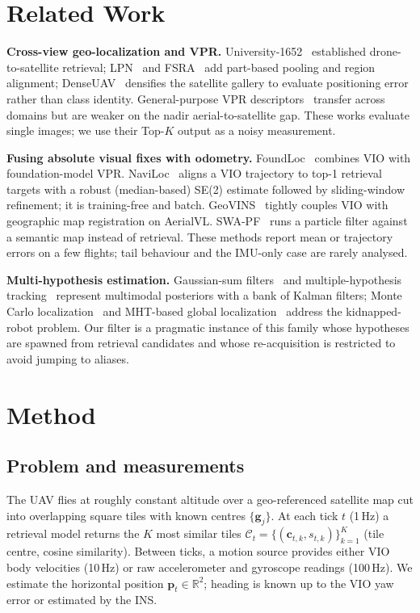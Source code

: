 \documentclass[journal]{IEEEtran}
\newcommand{\R}{\mathbb{R}}
\begin{document}
\section{Related Work}
\textbf{Cross-view geo-localization and VPR.} University-1652~\cite{zheng2020university} established drone-to-satellite
retrieval; LPN~\cite{wang2022lpn} and FSRA~\cite{dai2022fsra} add part-based pooling and region alignment;
DenseUAV~\cite{dai2024denseuav} densifies the satellite gallery to evaluate positioning error rather than class
identity. General-purpose VPR descriptors~\cite{arandjelovic2016netvlad,keetha2023anyloc} transfer across domains but
are weaker on the nadir aerial-to-satellite gap. These works evaluate single images; we use their Top-$K$ output as a
noisy measurement.

\textbf{Fusing absolute visual fixes with odometry.} FoundLoc~\cite{he2023foundloc} combines VIO with foundation-model
VPR. NaviLoc~\cite{shpagin2026naviloc} aligns a VIO trajectory to top-1 retrieval targets with a robust (median-based)
SE(2) estimate followed by sliding-window refinement; it is training-free and batch. GeoVINS~\cite{li2025geovins}
tightly couples VIO with geographic map registration on AerialVL. SWA-PF~\cite{swapf2025} runs a particle filter
against a semantic map instead of retrieval. These methods report mean or trajectory errors on a few flights; tail
behaviour and the IMU-only case are rarely analysed.

\textbf{Multi-hypothesis estimation.} Gaussian-sum filters~\cite{alspach1972gaussiansum} and multiple-hypothesis
tracking~\cite{reid1979mht} represent multimodal posteriors with a bank of Kalman filters; Monte Carlo
localization~\cite{dellaert1999mcl} and MHT-based global localization~\cite{jensfelt2001mht} address the kidnapped-robot
problem. Our filter is a pragmatic instance of this family whose hypotheses are spawned from retrieval candidates and
whose re-acquisition is restricted to avoid jumping to aliases.

\section{Method}\label{sec:method}
\subsection{Problem and measurements}
The UAV flies at roughly constant altitude over a geo-referenced satellite map cut into overlapping square tiles with
known centres $\{\mathbf{g}_j\}$. At each tick $t$ (1\,Hz) a retrieval model returns the $K$ most similar tiles
$\mathcal{C}_t=\{(\mathbf{c}_{t,k}, s_{t,k})\}_{k=1}^{K}$ (tile centre, cosine similarity). Between ticks, a motion
source provides either VIO body velocities (10\,Hz) or raw accelerometer and gyroscope readings (100\,Hz). We estimate
the horizontal position $\mathbf{p}_t\in\R^2$; heading is known up to the VIO yaw error or estimated by the INS.
\end{document}
